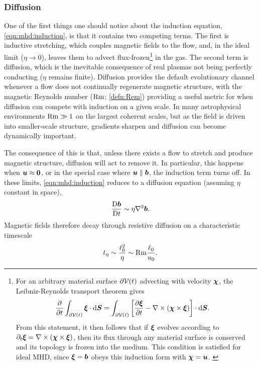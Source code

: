 \subsubsection{Diffusion}
\label{sec:evolve:decay}

One of the first things one should notice about the induction equation, \autoref{eqn:mhd:induction}, is that it contains two competing terms. The first is inductive stretching, which couples magnetic fields to the flow, and, in the ideal limit ($\eta \to 0$), leaves them to advect flux-frozen\footnote{
    For an arbitrary material surface $\partial\mathcal{V}(t)$ advecting with velocity $\bm{\chi}$, the Leibniz-Reynolds transport theorem gives
    \begin{align}
    \frac{\partial}{\partial t} \int_{\partial\mathcal{V}(t)} \bm{\xi} \cdot\mathrm{d} \bm{S}
        &= \int_{\partial\mathcal{V}(t)} \left[ 
                \frac{\partial \bm{\xi}}{\partial t}
                - \nabla\times(\bm{\chi}\times\bm{\xi})
             \right]\cdot\mathrm{d} \bm{S}
        .
    \end{align}
    From this statement, it then follows that if $\bm{\xi}$ evolves according to $\partial _t\bm{\xi} = \nabla\times(\bm{\chi}\times\bm{\xi})$, then its flux through any material surface is conserved and its topology is frozen into the medium. This condition is satisfied for ideal MHD, since $\bm{\xi} = \bm{b}$ obeys this induction form with $\bm{\chi} = \bm{u}$.
    \label{fnote:frozen}
} in the gas. The second term is diffusion, which is the inevitable consequence of real plasmas not being perfectly conducting ($\eta$ remains finite). Diffusion provides the default evolutionary channel whenever a flow does not continually regenerate magnetic structure, with the magnetic Reynolds number ($\mathrm{Rm}$; \autoref{defn:Rem}) providing a useful metric for when diffusion can compete with induction on a given scale. In many astrophysical environments $\mathrm{Rm} \gg 1$ on the largest coherent scales, but as the field is driven into smaller-scale structure, gradients sharpen and diffusion can become dynamically important.

The consequence of this is that, unless there exists a flow to stretch and produce magnetic structure, diffusion will act to remove it. In particular, this happens when $\bm{u} \approx \bm{0}$, or in the special case where $\bm{u}\parallel\bm{b}$, the induction term turns off. In these limits, \autoref{eqn:mhd:induction} reduces to a diffusion equation (assuming $\eta$ constant in space),
\begin{align}
    \frac{\mathrm{D} \bm{b}}{\mathrm{D} t}
        \sim \eta \nabla^2 \bm{b}
    .
\end{align}
Magnetic fields therefore decay through resistive diffusion on a characteristic timescale
\begin{align}
    t_\eta
        \sim \frac{\ell_0^2}{\eta}
        \sim \mathrm{Rm} \frac{\ell_0}{u_0}
    .
\end{align}

